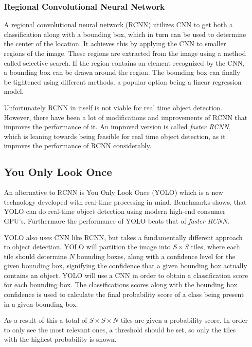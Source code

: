 \subsubsection{Regional Convolutional Neural Network}
A regional convolutional neural network (RCNN) utilizes CNN to get both a classification along with a bounding box, which in turn can be used to determine the center of the location.
It achieves this by applying the CNN to smaller regions of the image. 
These regions are extracted from the image using a method called selective search.
If the region contains an element recognized by the CNN, a bounding box can be drawn around the region.
The bounding box can finally be tightened using different methods, a popular option being a linear regression model.\cite{CNNHistory}

Unfortunately RCNN in itself is not viable for real time object detection.
However, there have been a lot of modifications and improvements of RCNN that improves the performance of it.
An improved version is called \textit{faster RCNN}, which is leaning towards being feasible for real time object detection, as it improves the performance of RCNN considerably\cite{fasterRCNN}.

\subsection{You Only Look Once}\label{sec:YOLOAnalysis}
An alternative to RCNN is You Only Look Once (YOLO) which is a new technology developed with real-time processing in mind.
Benchmarks shows, that YOLO can do real-time object detection using modern high-end consumer GPU's.
Furthermore the performance of YOLO beats that of \textit{faster RCNN}\cite{odDetection}.

YOLO also uses CNN like RCNN, but takes a fundamentally different approach to object detection.
YOLO will partition the image into $S\times S$ tiles, where each tile should determine $N$ bounding boxes, along with a confidence level for the given bounding box, signifying the confidence that a given bounding box actually contains an object.
YOLO will use a CNN in order to obtain a classification score for each bounding box.
The classifications scores along with the bounding box confidence is used to calculate the final probability score of a class being present in a given bounding box.\cite{odDetection}

As a result of this a total of $S\times S\times N$ tiles are given a probability score.
In order to only see the most relevant ones, a threshold should be set, so only the tiles with the highest probability is shown.

